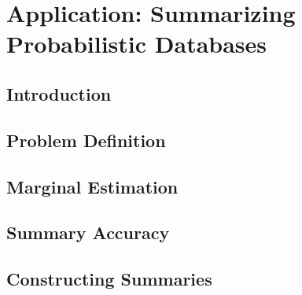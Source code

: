 \chapter{Application: Summarizing Probabilistic Databases}
\section{Introduction}


\section{Problem Definition}


\section{Marginal Estimation}


\section{Summary Accuracy}


\section{Constructing Summaries}
%

%